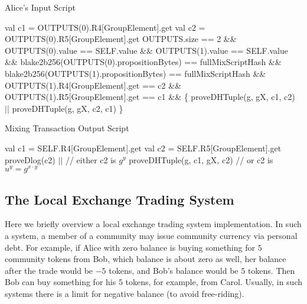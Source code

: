  \begin{algorithm}[H]
    \caption{Alice's Input Script}
    \label{alg:alice}
    \begin{algorithmic}[1]
        \State val c1 = OUTPUTS(0).R4[GroupElement].get
        \State val c2 = OUTPUTS(0).R5[GroupElement].get
        \State
        \State OUTPUTS.size == 2 \&\&
        \State OUTPUTS(0).value == SELF.value \&\&
        \State OUTPUTS(1).value == SELF.value \&\&
        \State blake2b256(OUTPUTS(0).propositionBytes) == fullMixScriptHash \&\&
        \State blake2b256(OUTPUTS(1).propositionBytes) == fullMixScriptHash \&\&
        \State OUTPUTS(1).R4[GroupElement].get == c2 \&\&
        \State OUTPUTS(1).R5[GroupElement].get == c1 \&\& \{
        \State\hspace{\algorithmicindent}  proveDHTuple(g, gX, c1, c2) $||$
        \State\hspace{\algorithmicindent}  proveDHTuple(g, gX, c2, c1)
        \State \}
    \end{algorithmic}
 \end{algorithm}

 \begin{algorithm}[H]
    \caption{Mixing Transaction Output Script}
    \label{alg:mixing-out}
    \begin{algorithmic}[1]
        \State val c1 = SELF.R4[GroupElement].get
        \State val c2 = SELF.R5[GroupElement].get
        \State proveDlog(c2) $||$            // either c2 is $g^y$
        \State proveDHTuple(g, c1, gX, c2) // or c2 is $u^y = g^{x \cdot y}$
    \end{algorithmic}
 \end{algorithm}


\subsection{The Local Exchange Trading System}
 \label{sec:platform}

 Here we briefly overview a local exchange trading system implementation. In such a system, a member of a community may
 issue community currency via personal debt. For example, if Alice with zero balance is buying something for $5$
 community tokens from Bob, which balance is about zero as well, her balance after the trade would be $-5$ tokens, and
 Bob's balance would be $5$ tokens. Then Bob can buy something for his $5$ tokens, for example, from Carol.
 Usually, in such systems there is a limit for negative balance (to avoid free-riding).

